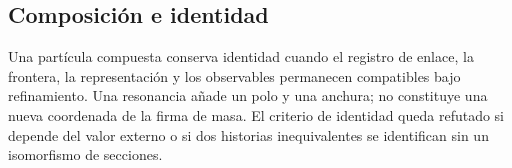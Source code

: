 \let\clearpage\relax

\endgroup
\begingroup
\let\chapter\section
\let\section\subsection
\let\subsection\subsubsection
\let\subsubsection\paragraph
\let\clearpage\relax

\endgroup

\section{Composición e identidad}
Una partícula compuesta conserva identidad cuando el registro de enlace, la
frontera, la representación y los observables permanecen compatibles bajo
refinamiento. Una resonancia añade un polo y una anchura; no constituye una
nueva coordenada de la firma de masa. El criterio de identidad queda refutado
si depende del valor externo o si dos historias inequivalentes se identifican
sin un isomorfismo de secciones.
